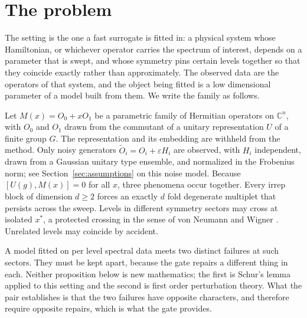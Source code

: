 \documentclass[11pt]{article}
\newcommand{\comm}[2]{[#1,#2]}
\begin{document}
\begin{abstract}
multiplicity and dimension separate for the first time, exposed and eliminated
two defective estimators that all regular representation tests had passed. The
failure this addresses occurs wherever a fast surrogate is fitted to a parametric
eigenvalue problem that carries symmetry, which includes nuclear structure,
molecular electronic structure, and band structure calculations, and a
demonstration on a physical system is the natural next step. The demonstrated
object here is a gated estimator with a low dimensional trained parameter; a
full parametric matrix model, in which the matrices themselves are learned, is
not demonstrated here and is stated as the immediate next experiment. We state
the conditions under which each claim holds.
\end{abstract}

\section{The problem}
The setting is the one a fast surrogate is fitted in: a physical system whose
Hamiltonian, or whichever operator carries the spectrum of interest, depends on
a parameter that is swept, and whose symmetry pins certain levels together so
that they coincide exactly rather than approximately. The observed data are the
operators of that system, and the object being fitted is a low dimensional
parameter of a model built from them. We write the family as follows.

Let $M(x)=O_0+xO_1$ be a parametric family of Hermitian operators on
$\mathbb{C}^n$, with $O_0$ and $O_1$ drawn from the commutant of a unitary
representation $U$ of a finite group $G$. The representation and its embedding
are withheld from the method. Only noisy generators
$\tilde O_i=O_i+\varepsilon H_i$ are observed, with $H_i$ independent, drawn from
a Gaussian unitary type ensemble, and normalized in the Frobenius norm; see
Section~\ref{sec:assumptions} on this noise model. Because
$\comm{U(g)}{M(x)}=0$ for all $x$, three phenomena occur together. Every irrep
block of dimension $d\ge2$ forces an exactly $d$ fold degenerate multiplet that
persists across the sweep. Levels in different symmetry sectors may cross at
isolated $x^\ast$, a protected crossing in the sense of von Neumann and Wigner
\cite{vNW1929}. Unrelated levels may coincide by accident.

A model fitted on per level spectral data meets two distinct failures at such
sectors. They must be kept apart, because the gate repairs a different thing in
each. Neither proposition below is new mathematics; the first is Schur's lemma
applied to this setting and the second is first order perturbation theory. What
the pair establishes is that the two failures have opposite characters, and
therefore require opposite repairs, which is what the gate provides.
\end{document}
